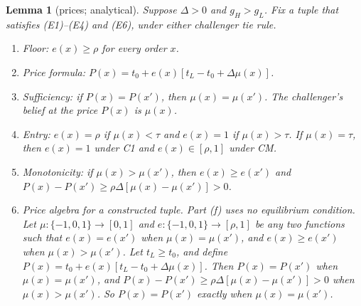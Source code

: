 \documentclass[11pt]{article}
\newtheorem{lemma}{Lemma}
\theoremstyle{definition}
\begin{document}
\begin{lemma}[prices; analytical]\label{lem:price}
Suppose $\Delta>0$ and $g_H>g_L$. Fix a tuple that satisfies (E1)--(E4) and (E6), under either challenger tie rule.
\begin{enumerate}[label=(\alph*)]
\item Floor: $e(x)\ge\rho$ for every order $x$.
\item Price formula: $P(x)=t_0+e(x)[t_L-t_0+\Delta\mu(x)]$.
\item Sufficiency: if $P(x)=P(x')$, then $\mu(x)=\mu(x')$. The challenger's belief at the price $P(x)$ is $\mu(x)$.
\item Entry: $e(x)=\rho$ if $\mu(x)<\tau$ and $e(x)=1$ if $\mu(x)>\tau$. If $\mu(x)=\tau$, then $e(x)=1$ under C1
  and $e(x)\in[\rho,1]$ under CM.
\item Monotonicity: if $\mu(x)>\mu(x')$, then $e(x)\ge e(x')$ and $P(x)-P(x')\ge\rho\Delta[\mu(x)-\mu(x')]>0$.
\item Price algebra for a constructed tuple. Part (f) uses no equilibrium condition. Let
  $\mu:\{-1,0,1\}\to[0,1]$ and $e:\{-1,0,1\}\to[\rho,1]$ be any two functions such that $e(x)=e(x')$ when
  $\mu(x)=\mu(x')$, and $e(x)\ge e(x')$ when $\mu(x)>\mu(x')$. Let $t_L\ge t_0$, and define
  $P(x)=t_0+e(x)[t_L-t_0+\Delta\mu(x)]$. Then $P(x)=P(x')$ when $\mu(x)=\mu(x')$, and
  $P(x)-P(x')\ge\rho\Delta[\mu(x)-\mu(x')]>0$ when $\mu(x)>\mu(x')$. So $P(x)=P(x')$ exactly when $\mu(x)=\mu(x')$.
\end{enumerate}
\end{lemma}
\end{document}

